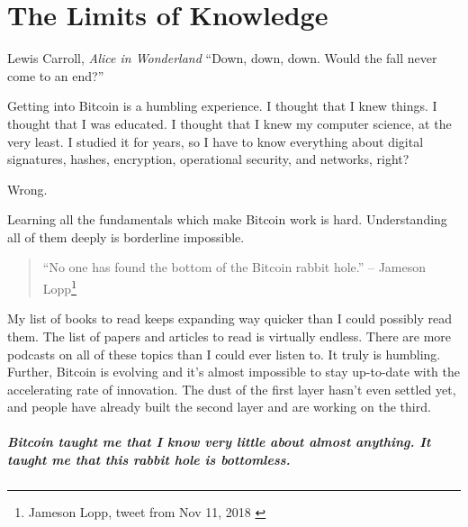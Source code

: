 \chapter{The Limits of Knowledge}
\label{les:7}

\begin{chapquote}{Lewis Carroll, \textit{Alice in Wonderland}}
``Down, down, down. Would the fall never come to an end?''
\end{chapquote}

Getting into Bitcoin is a humbling experience. I thought that I knew
things. I thought that I was educated. I thought that I knew my computer
science, at the very least. I studied it for years, so I have to know
everything about digital signatures, hashes, encryption, operational
security, and networks, right?

Wrong.

Learning all the fundamentals which make Bitcoin work is hard.
Understanding all of them deeply is borderline impossible.

\begin{quotation}
``No one has found the bottom of the Bitcoin rabbit hole.''
\flushright -- Jameson Lopp\footnote{Jameson Lopp, tweet from Nov 11, 2018 \cite{lopp-tweet}}
\end{quotation}

My list of books to read keeps expanding way quicker than I could
possibly read them. The list of papers and articles to read is virtually
endless. There are more podcasts on all of these topics than I could
ever listen to. It truly is humbling. Further, Bitcoin is evolving and
it's almost impossible to stay up-to-date with the accelerating rate of
innovation. The dust of the first layer hasn't even settled yet, and
people have already built the second layer and are working on the third.

\paragraph{Bitcoin taught me that I know very little about almost anything. It
taught me that this rabbit hole is bottomless.}

%
%
%
%
%
